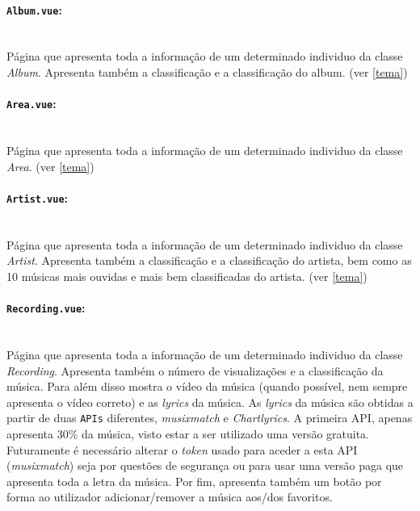 \documentclass{article}
\begin{document}
\paragraph{\texttt{Album.vue}:}\mbox{}\\

Página que apresenta toda a informação de um determinado individuo da classe \textit{Album}. Apresenta também a classificação e a classificação do album. (ver \ref{tema})

\paragraph{\texttt{Area.vue}:}\mbox{}\\

Página que apresenta toda a informação de um determinado individuo da classe \textit{Area}. (ver \ref{tema})

\paragraph{\texttt{Artist.vue}:}\mbox{}\\

Página que apresenta toda a informação de um determinado individuo da classe \textit{Artist}. Apresenta também a classificação e a classificação do artista, bem como as 10 músicas mais ouvidas e mais bem classificadas do artista. (ver \ref{tema})

\paragraph{\texttt{Recording.vue}:}\mbox{}\\

Página que apresenta toda a informação de um determinado individuo da classe \textit{Recording}. Apresenta também o número de visualizações e a classificação da música. Para além disso mostra o vídeo da música (quando possível, nem sempre apresenta o vídeo correto) e as \textit{lyrics} da música. As \textit{lyrics} da música são obtidas a partir de duas \texttt{APIs} diferentes, \textit{musixmatch} e \textit{Chartlyrics}. A primeira API, apenas apresenta 30\% da música, visto estar a ser utilizado uma versão gratuita. Futuramente é necessário alterar o \textit{token} usado para aceder a esta API (\textit{musixmatch}) seja por questões de segurança ou para usar uma versão paga que apresenta toda a letra da música. Por fim, apresenta também um botão por forma ao utilizador adicionar/remover a música aos/dos favoritos.
\end{document}
